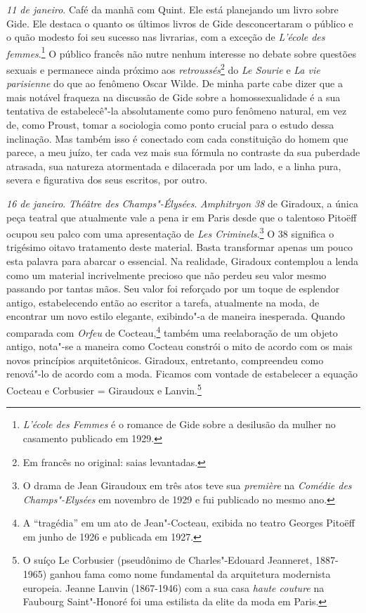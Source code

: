 \emph{11 de janeiro}. Café da manhã com Quint. Ele está planejando um
livro sobre Gide. Ele destaca o quanto os últimos livros de Gide
desconcertaram o público e o quão modesto foi seu sucesso nas livrarias,
com a exceção de \emph{L'école des femmes}.\footnote{\emph{L'école
  des Femmes} é o romance de Gide sobre a desilusão da mulher no
  casamento publicado em 1929. \versal{[N. E.]}} O público francês não nutre nenhum
interesse no debate sobre questões sexuais e permanece ainda próximo aos
\emph{retroussés}\footnote{Em francês no original: saias levantadas. \versal{[N. T.]}} do \emph{Le Sourie} e \emph{La vie parisienne} do
que ao fenômeno Oscar Wilde. De minha parte cabe dizer que a mais
notável fraqueza na discussão de Gide sobre a homossexualidade é a sua
tentativa de estabelecê"-la absolutamente como puro fenômeno natural, em
vez de, como Proust, tomar a sociologia como ponto crucial para o estudo
dessa inclinação. Mas também isso é conectado com cada constituição do
homem que parece, a meu juízo, ter cada vez mais sua fórmula no
contraste da sua puberdade atrasada, sua natureza atormentada e
dilacerada por um lado, e a linha pura, severa e figurativa dos seus
escritos, por outro.

\emph{16 de janeiro}. \emph{Théâtre des Champs"-Élysées}. \emph{Amphitryon 38} de
Giradoux, a única peça teatral que atualmente vale a pena ir em Paris
desde que o talentoso Pitoëff ocupou seu palco com uma apresentação de
\emph{Les Criminels}.\footnote{O drama de Jean Giraudoux em três
  atos teve sua \emph{première} na \emph{Comédie des Champs"-Elysées} em
  novembro de 1929 e fui publicado no mesmo ano. \versal{[N. E.]}} O 38 significa o
trigésimo oitavo tratamento deste material. Basta transformar apenas um
pouco esta palavra para abarcar o essencial. Na realidade, Giradoux
contemplou a lenda como um material incrivelmente precioso que não
perdeu seu valor mesmo passando por tantas mãos. Seu valor foi
reforçado por um toque de esplendor antigo, estabelecendo então ao
escritor a tarefa, atualmente na moda, de encontrar um novo estilo
elegante, exibindo"-a de maneira inesperada. Quando comparada com
\emph{Orfeu} de Cocteau,\footnote{A ``tragédia'' em um ato de
  Jean"-Cocteau, exibida no teatro Georges Pitoëff em junho de 1926 e
  publicada em 1927. \versal{[N. E.]}} também uma reelaboração de um objeto antigo,
nota"-se a maneira como Cocteau constrói o mito de acordo com os mais
novos princípios arquitetônicos. Giradoux, entretanto, compreendeu como
renová"-lo de acordo com a moda. Ficamos com vontade de estabelecer a
equação Cocteau e Corbusier = Giraudoux e Lanvin.\footnote{O suíço Le
  Corbusier (pseudônimo de Charles"-Edouard Jeanneret, 1887-1965) ganhou
  fama como nome fundamental da arquitetura modernista europeia. Jeanne
  Lanvin (1867-1946) com a sua casa \emph{haute couture} na Faubourg
  Saint"-Honoré foi uma estilista da elite da moda em Paris. \versal{[N. E.]}}

